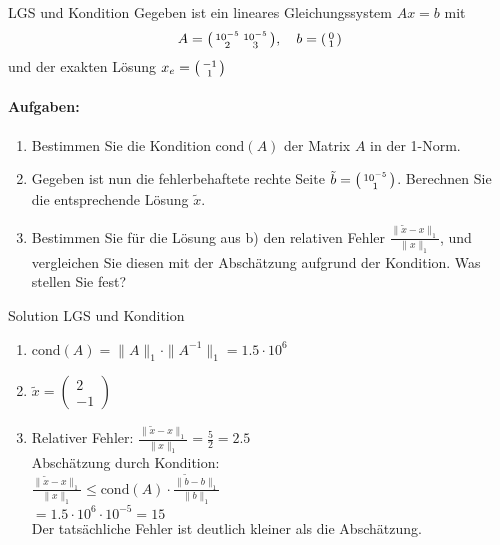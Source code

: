 \begin{example2}{LGS und Kondition}
Gegeben ist ein lineares Gleichungssystem $Ax = b$ mit
$$A = \begin{psmallmatrix}
10^{-5} & 10^{-5}\\
2 & 3
\end{psmallmatrix}, \quad
b = \begin{psmallmatrix}
0\\
1
\end{psmallmatrix}$$
und der exakten Lösung $x_e = \begin{psmallmatrix}-1\\1\end{psmallmatrix}$

\paragraph{Aufgaben:}
\begin{enumerate}
    \item Bestimmen Sie die Kondition cond$(A)$ der Matrix $A$ in der 1-Norm.
    
    \item Gegeben ist nun die fehlerbehaftete rechte Seite $\tilde{b} = \begin{psmallmatrix}10^{-5}\\1\end{psmallmatrix}$. Berechnen Sie die entsprechende Lösung $\tilde{x}$.
    
    \item Bestimmen Sie für die Lösung aus b) den relativen Fehler $\frac{\|\tilde{x}-x\|_1}{\|x\|_1}$, und vergleichen Sie diesen mit der Abschätzung aufgrund der Kondition. Was stellen Sie fest?
\end{enumerate}
\end{example2}

\begin{KR}{Solution LGS und Kondition}
\begin{enumerate}
    \item $\text{cond}(A) = \|A\|_1 \cdot \|A^{-1}\|_1 = 1.5 \cdot 10^6$
    
    \item $\tilde{x} = \begin{pmatrix}2\\-1\end{pmatrix}$
    
    \item Relativer Fehler: $\frac{\|\tilde{x}-x\|_1}{\|x\|_1} = \frac{5}{2} = 2.5$\\
    Abschätzung durch Kondition:\\
    $\frac{\|\tilde{x}-x\|_1}{\|x\|_1} \leq \text{cond}(A) \cdot \frac{\|\tilde{b}-b\|_1}{\|b\|_1}$\\
    $= 1.5 \cdot 10^6 \cdot 10^{-5} = 15$\\
    Der tatsächliche Fehler ist deutlich kleiner als die Abschätzung.
\end{enumerate}
\end{KR}

